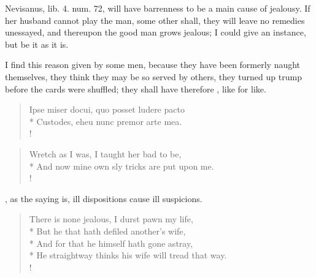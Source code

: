 Nevisanus, lib. 4. num. 72, will have barrenness to be a main
cause of jealousy. If her husband cannot play the man, some other
shall, they will leave no remedies unessayed, and thereupon the good
man grows jealous; I could give an instance, but be it as it is.

I find this reason given by some men, because they have been formerly
naught themselves, they think they may be so served by others, they
turned up trump before the cards were shuffled; they shall have
therefore , like for like.
%
\begin{latin}%
\begin{verse}%
Ipse miser docui, quo posset ludere pacto\\*
Custodes, eheu nunc premor arte mea.\\!
\end{verse}%
\end{latin}%
\translationrule%
\begin{verse}%
Wretch as I was, I taught her bad to be,\\*
And now mine own sly tricks are put upon me.\\!
\end{verse}%
%
%
, as the saying is, ill dispositions cause ill
suspicions.
%
\begin{verse}%
There is none jealous, I durst pawn my life,\\*
But he that hath defiled another's wife,\\*
And for that he himself hath gone astray,\\*
He straightway thinks his wife will tread that way.\\!
\end{verse}%
%

